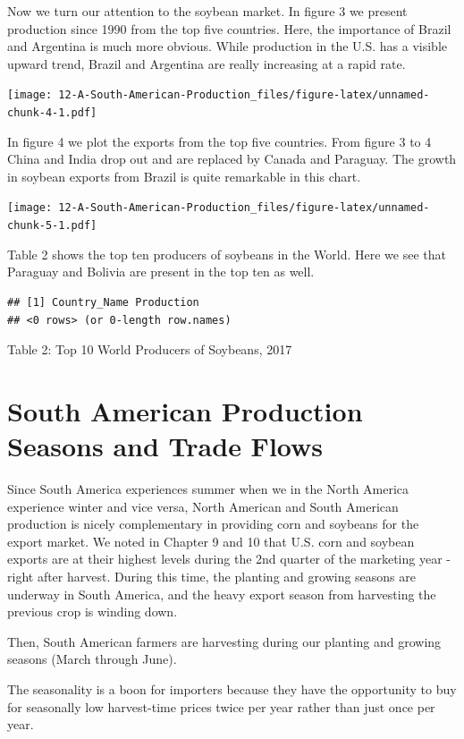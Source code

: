 \documentclass[
]{book}
\begin{document}
Now we turn our attention to the soybean market. In figure 3 we present production since 1990 from the top five countries. Here, the importance of Brazil and Argentina is much more obvious. While production in the U.S. has a visible upward trend, Brazil and Argentina are really increasing at a rapid rate.

\texttt{[image: 12-A-South-American-Production\_files/figure-latex/unnamed-chunk-4-1.pdf]}

In figure 4 we plot the exports from the top five countries. From figure 3 to 4 China and India drop out and are replaced by Canada and Paraguay. The growth in soybean exports from Brazil is quite remarkable in this chart.

\texttt{[image: 12-A-South-American-Production\_files/figure-latex/unnamed-chunk-5-1.pdf]}

Table 2 shows the top ten producers of soybeans in the World. Here we see that Paraguay and Bolivia are present in the top ten as well.

\begin{verbatim}
## [1] Country_Name Production  
## <0 rows> (or 0-length row.names)
\end{verbatim}

Table 2: Top 10 World Producers of Soybeans, 2017

\hypertarget{south-american-production-seasons-and-trade-flows}{%
\section{South American Production Seasons and Trade Flows}\label{south-american-production-seasons-and-trade-flows}}

Since South America experiences summer when we in the North America experience winter and vice versa, North American and South American production is nicely complementary in providing corn and soybeans for the export market. We noted in Chapter 9 and 10 that U.S. corn and soybean exports are at their highest levels during the 2nd quarter of the marketing year - right after harvest. During this time, the planting and growing seasons are underway in South America, and the heavy export season from harvesting the previous crop is winding down.

Then, South American farmers are harvesting during our planting and growing seasons (March through June).

The seasonality is a boon for importers because they have the opportunity to buy for seasonally low harvest-time prices twice per year rather than just once per year.
\end{document}
